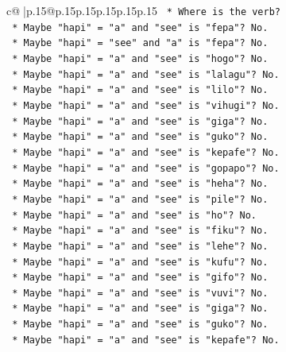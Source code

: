 \documentclass{article}
\begin{document}
{\begin{supertabular}{c@{$\;$}|p{.15\linewidth}@{}p{.15\linewidth}p{.15\linewidth}p{.15\linewidth}p{.15\linewidth}p{.15\linewidth}}
{{{\texttt{                        *   Where is the verb?} \\
\texttt{                        *   Maybe "hapi" = "a" and "see" is "fepa"? No.} \\
\texttt{                        *   Maybe "hapi" = "see" and "a" is "fepa"? No.} \\
\texttt{                        *   Maybe "hapi" = "a" and "see" is "hogo"? No.} \\
\texttt{                        *   Maybe "hapi" = "a" and "see" is "lalagu"? No.} \\
\texttt{                        *   Maybe "hapi" = "a" and "see" is "lilo"? No.} \\
\texttt{                        *   Maybe "hapi" = "a" and "see" is "vihugi"? No.} \\
\texttt{                        *   Maybe "hapi" = "a" and "see" is "giga"? No.} \\
\texttt{                        *   Maybe "hapi" = "a" and "see" is "guko"? No.} \\
\texttt{                        *   Maybe "hapi" = "a" and "see" is "kepafe"? No.} \\
\texttt{                        *   Maybe "hapi" = "a" and "see" is "gopapo"? No.} \\
\texttt{                        *   Maybe "hapi" = "a" and "see" is "heha"? No.} \\
\texttt{                        *   Maybe "hapi" = "a" and "see" is "pile"? No.} \\
\texttt{                        *   Maybe "hapi" = "a" and "see" is "ho"? No.} \\
\texttt{                        *   Maybe "hapi" = "a" and "see" is "fiku"? No.} \\
\texttt{                        *   Maybe "hapi" = "a" and "see" is "lehe"? No.} \\
\texttt{                        *   Maybe "hapi" = "a" and "see" is "kufu"? No.} \\
\texttt{                        *   Maybe "hapi" = "a" and "see" is "gifo"? No.} \\
\texttt{                        *   Maybe "hapi" = "a" and "see" is "vuvi"? No.} \\
\texttt{                        *   Maybe "hapi" = "a" and "see" is "giga"? No.} \\
\texttt{                        *   Maybe "hapi" = "a" and "see" is "guko"? No.} \\
\texttt{                        *   Maybe "hapi" = "a" and "see" is "kepafe"? No.} \\
}}}
\end{supertabular}}
\end{document}
